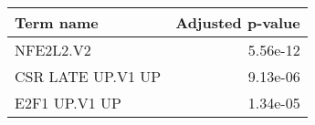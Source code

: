 \begin{tabular}{lr}
\toprule
        Term name &  Adjusted p-value \\
\midrule
        NFE2L2.V2 &          5.56e-12 \\
CSR LATE UP.V1 UP &          9.13e-06 \\
    E2F1 UP.V1 UP &          1.34e-05 \\
\bottomrule
\end{tabular}

